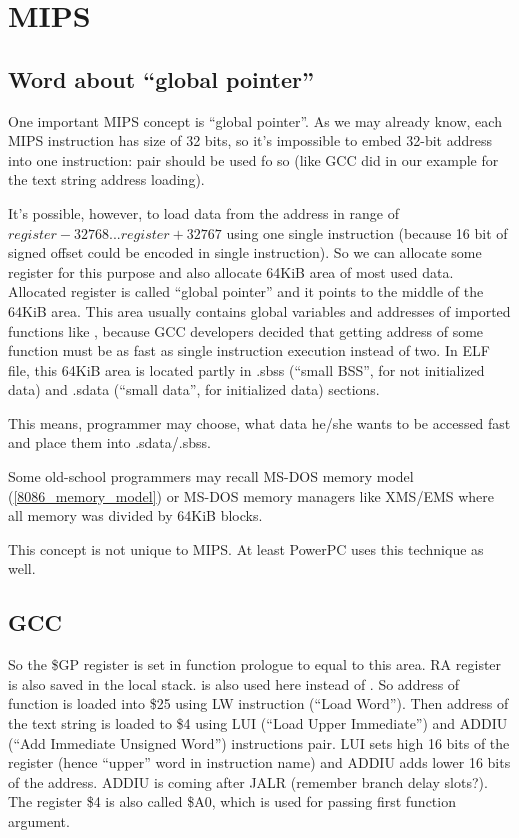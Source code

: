 ﻿\ifx\RUSSIAN\undefined
\section{MIPS}

\subsection{Word about ``global pointer''}

One important MIPS concept is ``global pointer''.
As we may already know, each MIPS instruction has size of 32 bits, so it's impossible to embed 32-bit
address into one instruction: pair should be used fo so (like GCC did in our example for the text string address
loading).

It's possible, however, to load data from the address in range of $register-32768...register+32767$ using one
single instruction (because 16 bit of signed offset could be encoded in single instruction).
So we can allocate some register for this purpose and also allocate 64KiB area of most used data.
Allocated register is called ``global pointer'' and it points to the middle of the 64KiB area.
This area usually contains global variables and addresses of imported functions like \printf, 
because GCC developers decided that getting address of some function must be as fast as single instruction
execution instead of two.
In ELF file, this 64KiB area is located partly in .sbss (``small \ac{BSS}'', for not initialized data) and 
.sdata (``small data'', for initialized data) sections.

This means, programmer may choose, what data he/she wants to be accessed fast and place them into .sdata/.sbss.

Some old-school programmers may recall MS-DOS memory model (\ref{8086_memory_model}) 
or MS-DOS memory managers like XMS/EMS where all memory was divided by 64KiB blocks.

This concept is not unique to MIPS. At least PowerPC uses this technique as well.

\subsection{\Optimizing GCC}



So the \$GP register is set in function prologue to equal to this area.
\ac{RA} register is also saved in the local stack.
\puts is also used here instead of \printf.
So address of \puts function is loaded into \$25 using LW instruction (``Load Word'').
Then address of the text string is loaded to \$4 using LUI (``Load Upper Immediate'') and 
ADDIU (``Add Immediate Unsigned Word'') instructions pair.
LUI sets high 16 bits of the register (hence ``upper'' word in instruction name) and ADDIU adds
lower 16 bits of the address.
ADDIU is coming after JALR (remember branch delay slots?).
The register \$4 is also called \$A0, which is used for passing first function argument.

